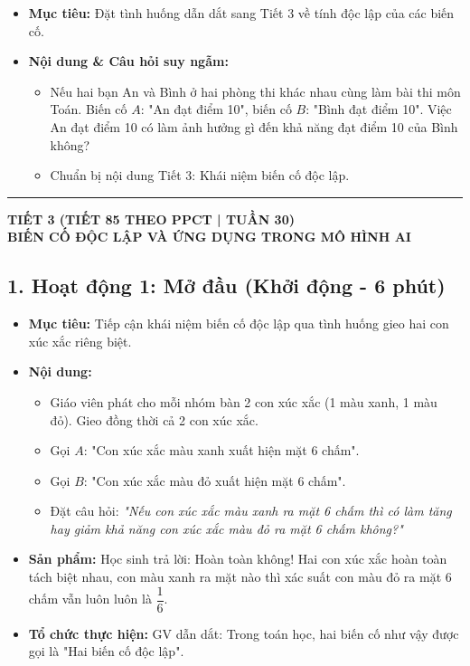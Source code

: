 \documentclass[12pt, a4paper]{article}
\begin{document}
\begin{itemize}[leftmargin=1.2cm]
    \item[a)] \textbf{Mục tiêu:} Đặt tình huống dẫn dắt sang Tiết 3 về tính độc lập của các biến cố.
    \item[b)] \textbf{Nội dung & Câu hỏi suy ngẫm:}
    \begin{itemize}[leftmargin=0.6cm]
        \item Nếu hai bạn An và Bình ở hai phòng thi khác nhau cùng làm bài thi môn Toán. Biến cố $A$: "An đạt điểm 10", biến cố $B$: "Bình đạt điểm 10". Việc An đạt điểm 10 có làm ảnh hưởng gì đến khả năng đạt điểm 10 của Bình không?
        \item Chuẩn bị nội dung Tiết 3: Khái niệm biến cố độc lập.
    \end{itemize}
\end{itemize}

\vspace{10pt}
\hrule
\vspace{10pt}

\begin{center}
    \textbf{\large TIẾT 3 (TIẾT 85 THEO PPCT | TUẦN 30)}\\[4pt]
    \textbf{\large BIẾN CỐ ĐỘC LẬP VÀ ỨNG DỤNG TRONG MÔ HÌNH AI}
\end{center}

\subsection*{1. Hoạt động 1: Mở đầu (Khởi động - 6 phút)}

\begin{itemize}[leftmargin=1.2cm]
    \item[a)] \textbf{Mục tiêu:} Tiếp cận khái niệm biến cố độc lập qua tình huống gieo hai con xúc xắc riêng biệt.
    \item[b)] \textbf{Nội dung:}
    \begin{itemize}[leftmargin=0.6cm]
        \item Giáo viên phát cho mỗi nhóm bàn 2 con xúc xắc (1 màu xanh, 1 màu đỏ). Gieo đồng thời cả 2 con xúc xắc.
        \item Gọi $A$: "Con xúc xắc màu xanh xuất hiện mặt 6 chấm".
        \item Gọi $B$: "Con xúc xắc màu đỏ xuất hiện mặt 6 chấm".
        \item Đặt câu hỏi: \textit{"Nếu con xúc xắc màu xanh ra mặt 6 chấm thì có làm tăng hay giảm khả năng con xúc xắc màu đỏ ra mặt 6 chấm không?"}
    \end{itemize}

    \item[c)] \textbf{Sản phẩm:} Học sinh trả lời: Hoàn toàn không! Hai con xúc xắc hoàn toàn tách biệt nhau, con màu xanh ra mặt nào thì xác suất con màu đỏ ra mặt 6 chấm vẫn luôn luôn là $\dfrac{1}{6}$.
    \item[d)] \textbf{Tổ chức thực hiện:} GV dẫn dắt: Trong toán học, hai biến cố như vậy được gọi là "Hai biến cố độc lập".
\end{itemize}
\end{document}
